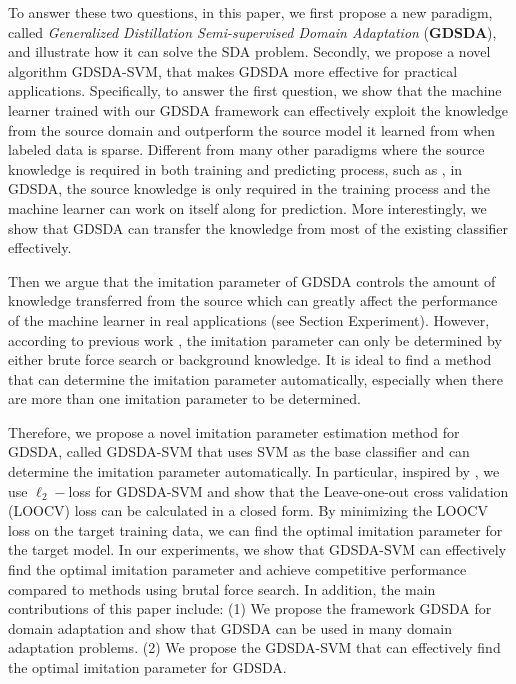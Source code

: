 To answer these two questions, in this paper, we first propose a new paradigm, called \textit{Generalized Distillation Semi-supervised Domain Adaptation} (\textbf{GDSDA}), and illustrate how it can solve the SDA problem. Secondly, we propose a novel algorithm GDSDA-SVM, that makes GDSDA more effective for practical applications. Specifically, to answer the first question, we show that the machine learner trained with our GDSDA framework can effectively exploit the knowledge from the source domain and outperform the source model it learned from when labeled data is sparse.
Different from many other paradigms where the source knowledge is required in both training and predicting process, such as \cite{kuzborskij2013stability}, in GDSDA, the source knowledge is only required in the training process and the machine learner can work on itself along for prediction. More interestingly, we show that GDSDA can transfer the knowledge from most of the existing classifier effectively.

Then we argue that the imitation parameter of GDSDA controls the amount of knowledge transferred from the source which can greatly affect the performance of the machine learner in real applications (see Section Experiment).
However, according to previous work \cite{lopez2015unifying,Tzeng_2015_ICCV}, the imitation parameter can only be determined by either brute force search or background knowledge. It is ideal to find a method that can determine the imitation parameter automatically, especially when there are more than one imitation parameter to be determined.

Therefore, we propose a novel imitation parameter estimation method for GDSDA, called GDSDA-SVM that uses SVM as the base classifier and can determine the imitation parameter automatically. In particular, inspired by \cite{cawley2006leave}, we use $\ell_2-$loss for GDSDA-SVM and show that the Leave-one-out cross validation (LOOCV) loss can be calculated in a closed form. By minimizing the LOOCV loss on the target training data, we can find the optimal imitation parameter for the target model. In our experiments, we show that GDSDA-SVM can effectively find the optimal imitation parameter and achieve competitive performance compared to methods using brutal force search. In addition, the main contributions of this paper include: (1) We propose the framework GDSDA for domain adaptation and show that GDSDA can be used in many domain adaptation problems. (2) We propose the GDSDA-SVM that can effectively find the optimal imitation parameter for GDSDA.

